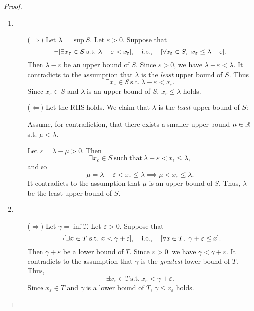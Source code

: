 \documentclass[11pt,openany]{article}
\begin{document}
\begin{proof}
	\begin{enumerate}[(1)]
		\item \begin{itemize}
			\item[($\Rightarrow$)] Let $\lambda=\sup S$. Let $\varepsilon>0$. Suppose that \[
			\lnot[\exists x_\varepsilon\in S\ \text{s.t.}\ \lambda-\varepsilon<x_\varepsilon],\quad\ie,\quad[\forall x_\varepsilon\in S,\ x_\varepsilon\leq\lambda-\varepsilon].
			\] Then $\lambda-\varepsilon$ be an upper bound of $S$. Since $\varepsilon>0$, we have $\lambda-\varepsilon<\lambda$. It contradicts to the assumption that $\lambda$ is the \textit{least} upper bound of $S$. Thus \[
			\exists x_\varepsilon\in S\ \text{s.t.}\ \lambda-\varepsilon< x_\varepsilon.
			\] Since $x_\varepsilon\in S$ and $\lambda$ is an upper bound of $S$,  $x_\varepsilon\leq\lambda$ holds.
			\vspace{20pt}
			\item[($\Leftarrow$)] Let the RHS holds. We claim that $\lambda$ is the \textit{least} upper bound of $S$:\par
				\begin{center}
				
				\end{center}
				Assume, for contradiction, that there exists a smaller upper bound $\mu\in\mathbb{R}$ s.t. $\mu<\lambda$.\par
				Let $\varepsilon=\lambda-\mu>0$. Then \[
				\exists x_\varepsilon\in S\ \text{such that}\ \lambda-\varepsilon <x_\epsilon\leq\lambda,
				\] and so \[
				\mu=\lambda-\varepsilon <x_\varepsilon\leq\lambda\implies \mu <x_\varepsilon\leq\lambda.
				\] It contradicts to the assumption that $\mu$ is an upper bound of $S$. Thus, $\lambda$ be the least upper bound of $S$.
		\end{itemize}
		\newpage
		\item \begin{itemize}
			\item[($\Rightarrow$)] Let $\gamma=\inf T$. Let $\varepsilon>0$. Suppose that \[
			\lnot[\exists x\in T\ \text{s.t.}\ x<\gamma+\varepsilon],\quad\ie,\quad[\forall x\in T,\ \gamma+\varepsilon\leq x].
			\] Then $\gamma+\varepsilon$ be a lower bound of $T$. Since $\varepsilon>0$,  we have $\gamma<\gamma+\varepsilon$. It contradicts to the assumption that $\gamma$ is the \textit{greatest} lower bound of $T$. Thus, \[
			\exists x_\varepsilon\in T\ \text{s.t.}\ x_\varepsilon<\gamma+\varepsilon.
			\]
			Since $x_\varepsilon\in T$ and $\gamma$ is a lower bound of $T$, $\gamma\leq x_\varepsilon$ holds.

\end{itemize}
\end{enumerate}
\end{proof}
\end{document}
